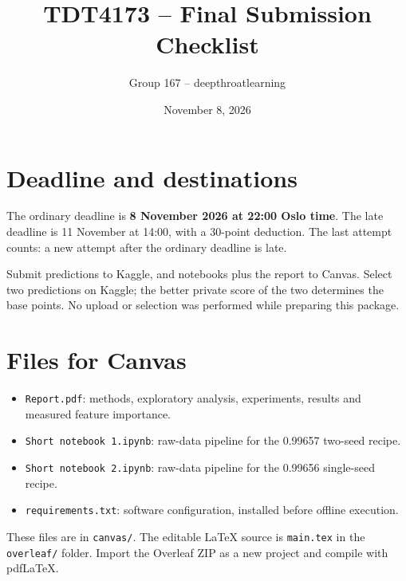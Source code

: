 \documentclass[a4paper,11pt]{article}
\title{TDT4173 -- Final Submission Checklist}
\author{Group 167 -- deepthroatlearning}
\date{November 8, 2026}
\begin{document}
\maketitle
\section{Deadline and destinations}
The ordinary deadline is \textbf{8 November 2026 at 22:00 Oslo time}. The late deadline is 11 November at 14:00, with a 30-point deduction. The last attempt counts: a new attempt after the ordinary deadline is late.

Submit predictions to Kaggle, and notebooks plus the report to Canvas. Select two predictions on Kaggle; the better private score of the two determines the base points. No upload or selection was performed while preparing this package.

\section{Files for Canvas}
\begin{itemize}
\item \texttt{Report.pdf}: methods, exploratory analysis, experiments, results and measured feature importance.
\item \texttt{Short notebook 1.ipynb}: raw-data pipeline for the 0.99657 two-seed recipe.
\item \texttt{Short notebook 2.ipynb}: raw-data pipeline for the 0.99656 single-seed recipe.
\item \texttt{requirements.txt}: software configuration, installed before offline execution.
\end{itemize}
These files are in \texttt{canvas/}. The editable LaTeX source is \texttt{main.tex} in the \texttt{overleaf/} folder. Import the Overleaf ZIP as a new project and compile with pdfLaTeX.
\end{document}
